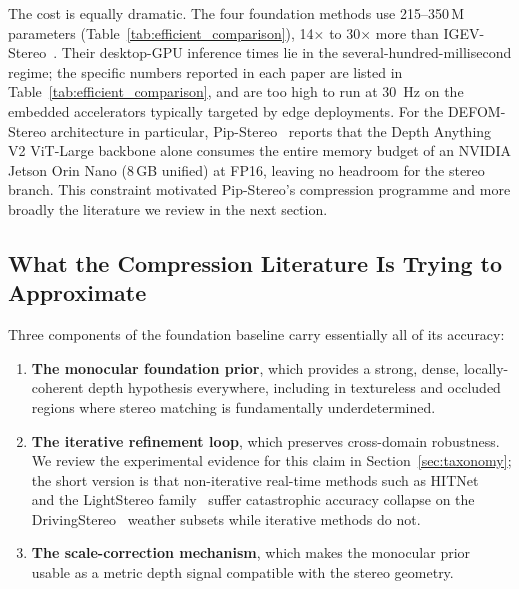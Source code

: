 The cost is equally dramatic. The four foundation methods use 215--350\,M parameters (Table~\ref{tab:efficient_comparison}), 14$\times$ to 30$\times$ more than IGEV-Stereo~\cite{xu2023igev}. Their desktop-GPU inference times lie in the several-hundred-millisecond regime; the specific numbers reported in each paper are listed in Table~\ref{tab:efficient_comparison}, and are too high to run at 30~Hz on the embedded accelerators typically targeted by edge deployments. For the DEFOM-Stereo architecture in particular, Pip-Stereo~\cite{zheng2026pipstereo} reports that the Depth Anything V2 ViT-Large backbone alone consumes the entire memory budget of an NVIDIA Jetson Orin Nano (8\,GB unified) at FP16, leaving no headroom for the stereo branch. This constraint motivated Pip-Stereo's compression programme and more broadly the literature we review in the next section.

\subsection{What the Compression Literature Is Trying to Approximate}

Three components of the foundation baseline carry essentially all of its accuracy:

\begin{enumerate}
\item \textbf{The monocular foundation prior}, which provides a strong, dense, locally-coherent depth hypothesis everywhere, including in textureless and occluded regions where stereo matching is fundamentally underdetermined.
\item \textbf{The iterative refinement loop}, which preserves cross-domain robustness. We review the experimental evidence for this claim in Section~\ref{sec:taxonomy}; the short version is that non-iterative real-time methods such as HITNet~\cite{tankovich2021hitnet} and the LightStereo family~\cite{guo2025lightstereo} suffer catastrophic accuracy collapse on the DrivingStereo~\cite{yang2019drivingstereo} weather subsets while iterative methods do not.
\item \textbf{The scale-correction mechanism}, which makes the monocular prior usable as a metric depth signal compatible with the stereo geometry.
\end{enumerate}

